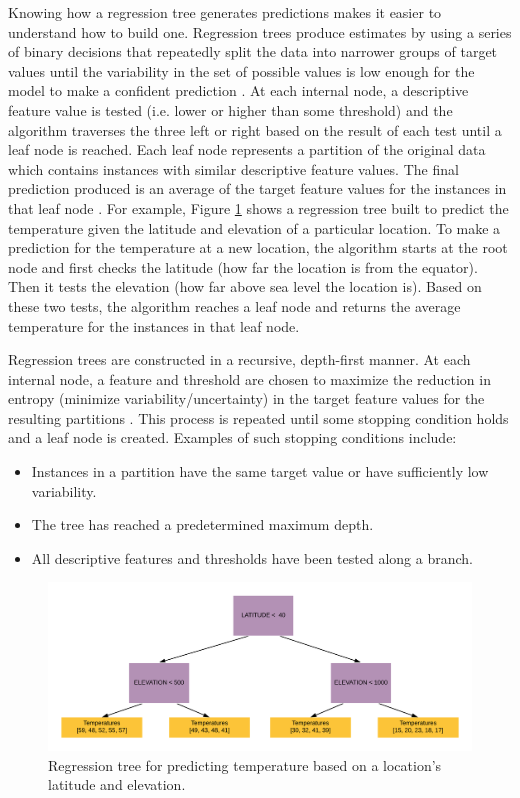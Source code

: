 \documentclass[pageno]{jpaper}
\begin{document}
Knowing how a regression tree generates predictions makes it easier to understand how to build one. Regression trees produce estimates by using a series of binary decisions that repeatedly split the data into narrower groups of target values until the variability in the set of possible values is low enough for the model to make a confident prediction \cite{trees}. At each internal node, a descriptive feature value is tested (i.e. lower or higher than some threshold) and the algorithm traverses the three left or right based on the result of each test until a leaf node is reached. Each leaf node represents a partition of the original data which contains instances with similar descriptive feature values. The final prediction produced is an average of the target feature values for the instances in that leaf node \cite{trees}.
For example, Figure \ref{fig:regtrees} shows a regression tree built to predict the temperature given the latitude and elevation of a particular location. To make a prediction for the temperature at a new location, the algorithm starts at the root node and first checks the latitude (how far the location is from the equator). Then it tests the elevation (how far above sea level the location is). Based on these two tests, the algorithm reaches a leaf node and returns the average temperature for the instances in that leaf node. 

Regression trees are constructed in a recursive, depth-first manner. At each internal node, a feature and threshold are chosen to maximize the reduction in entropy (minimize variability/uncertainty) in the target feature values for the resulting partitions \cite{mitfundamentals}. This process is repeated until some stopping condition holds and a leaf node is created. Examples of such stopping conditions include:

\begin{itemize} 
    \item Instances in a partition have the same target value or have sufficiently low variability.
    \item The tree has reached a predetermined maximum depth.
    \item All descriptive features and thresholds have been tested along a branch.
\end{itemize}

\begin{figure}[hbt]
\centering
\includegraphics[width=\linewidth]{regtrees.png}
\caption{Regression tree for predicting temperature based on a location's latitude and elevation.}
\label{fig:regtrees}
\end{figure}
\end{document}

